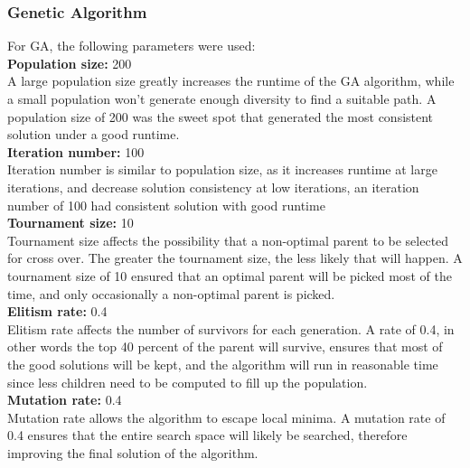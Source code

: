 \documentclass[conference]{IEEEtran}
\begin{document}
\subsubsection{Genetic Algorithm}
For GA, the following parameters were used:\\
\textbf{Population size: } 200 \\
A large population size greatly increases the runtime of the GA algorithm, while a small population won't generate enough diversity to find a suitable path. A population size of 200 was the sweet spot that generated the most consistent solution under a good runtime.\\
\textbf{Iteration number: } 100 \\
Iteration number is similar to population size, as it increases runtime at large iterations, and decrease solution consistency at low iterations, an iteration number of 100 had consistent solution with good runtime \\
\textbf{Tournament size: } 10 \\
Tournament size affects the possibility that a non-optimal parent to be selected for cross over. The greater the tournament size, the less likely that will happen. A tournament size of 10 ensured that an optimal parent will be picked most of the time, and only occasionally a non-optimal parent is picked.\\
\textbf{Elitism rate: } 0.4 \\
Elitism rate affects the number of survivors for each generation. A rate of 0.4, in other words the top 40 percent of the parent will survive, ensures that most of the good solutions will be kept, and the algorithm will run in reasonable time since less children need to be computed to fill up the population.\\
\textbf{Mutation rate: } 0.4 \\
Mutation rate allows the algorithm to escape local minima. A mutation rate of 0.4 ensures that the entire search space will likely be searched, therefore improving the final solution of the algorithm.
\end{document}
